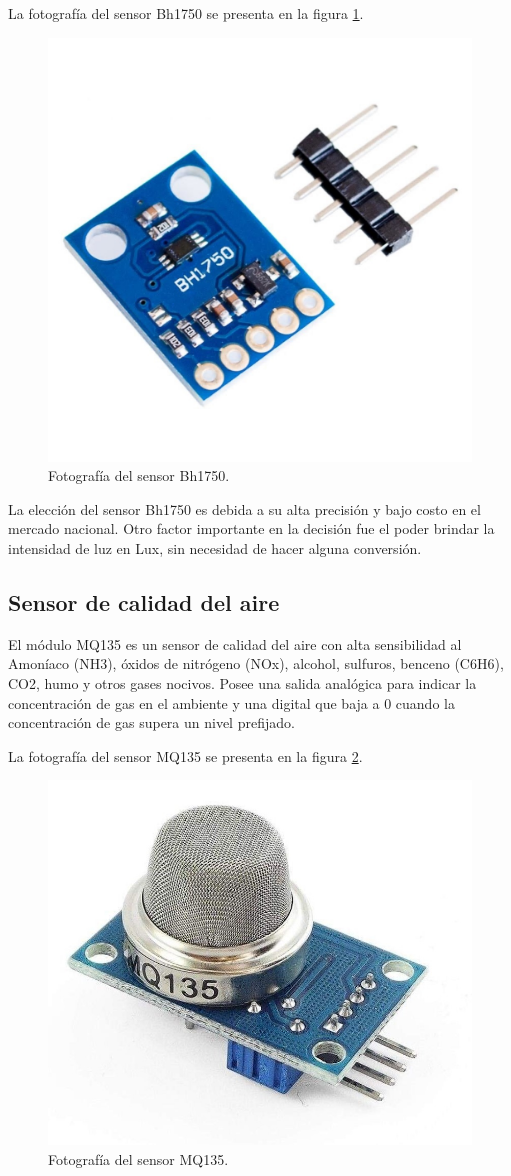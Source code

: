 La fotografía del sensor Bh1750 se presenta en la figura \ref{fig:fotografiaBh1750}.

\begin{figure}[H]
	\centering
	\includegraphics[width=.4\textwidth]{./Figures/Bh1750.jpg}
	\caption{Fotografía del sensor Bh1750\protect\footnotemark.}
	\label{fig:fotografiaBh1750}
\end{figure}


La elección del sensor Bh1750 es debida a su alta precisión y bajo costo en el mercado nacional. Otro factor importante en la decisión fue el poder brindar la intensidad de luz en Lux, sin necesidad de hacer alguna conversión.

\subsection{Sensor de calidad del aire}

El módulo MQ135 \citep{WEBSITE:MQ135} es un sensor de calidad del aire con alta sensibilidad al Amoníaco (NH3), óxidos de nitrógeno (NOx), alcohol, sulfuros, benceno (C6H6), CO2, humo y otros gases nocivos. Posee una salida analógica para indicar la concentración de gas en el ambiente y una digital que baja a 0 cuando la concentración de gas supera un nivel prefijado.

La fotografía del sensor MQ135 se presenta en la figura \ref{fig:fotografiaMQ135}.

\begin{figure}[H]
	\centering
	\includegraphics[width=.4\textwidth]{./Figures/MQ135.jpg}
	\caption{Fotografía del sensor MQ135\protect\footnotemark.}
	\label{fig:fotografiaMQ135}
\end{figure}

